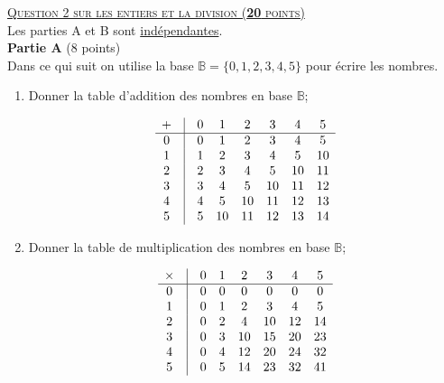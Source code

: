 \newcommand{\B}{\ensuremath{\mathbb{B}}}
\newcommand{\D}{\ensuremath{\mathbb{D}}}
\noindent
{\textsc{\underline{Question 2 sur les entiers et la division (\textbf{20} points)}}}\\


Les parties A et B sont \underline{indépendantes}.\\

\textbf{Partie A} (8 points)\\
Dans ce qui suit on utilise la base  $\B=\{0,1,2,3,4,5\}$ pour écrire les nombres.%

\begin{enumerate}[1. ]
\item{}Donner la table d'addition des nombres en base \B;
\begin{framed}
\[
\begin{matrix}
+ &\vline&0 &1 &2 &3 &4 &5\\
\hline
0 &\vline&0 &1 &2 &3 &4&5\\
1&\vline& 1& 2& 3& 4&5&10\\
2&\vline& 2& 3& 4& 5&10&11\\
3&\vline& 3& 4& 5& 10&11&12\\
4&\vline& 4& 5& 10& 11&12&13\\
5&\vline& 5& 10& 11& 12&13&14\\
\end{matrix}
\]

\end{framed}
\item{}Donner la table de multiplication des nombres en base \B;
\begin{framed}
\[
\begin{matrix}
\times &\vline&0 &1 &2 &3 &4 &5\\
\hline
0 &\vline& 0& 0& 0& 0&0&0\\
1&\vline& 0& 1& 2& 3&4&5\\
2&\vline& 0& 2& 4& 10&12&14\\
3&\vline& 0& 3& 10& 15&20&23\\
4&\vline& 0& 4& 12& 20&24&32\\
5&\vline& 0& 5& 14& 23&32&41\\
\end{matrix}
\]
\end{framed}


\end{enumerate}
